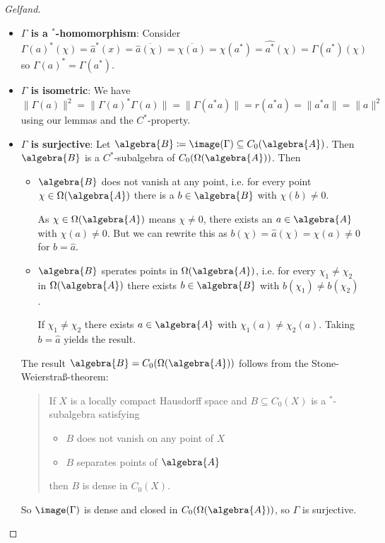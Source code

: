 \documentclass[a4paper]{article}
\begin{document}
\begin{proof}[Gelfand]~
	\begin{itemize}
		\item \textbf{$\Gamma$ is a $^*$-homomorphism}:
		Consider 
		\begin{equation*}
			\Gamma(a)^*(\chi) = \hat{a}^*(x) = \overline{\hat{a}(\chi)} = \overline{\chi(a)} = \chi(a^*) = \hat{a^*}(\chi) =  \Gamma(a^*)(\chi)
		\end{equation*}
		so $\Gamma(a)^* = \Gamma(a^*)$.
		\item \textbf{$\Gamma$ is isometric}:
		We have
		\begin{equation*}
			\|\Gamma(a)\|^2 = \|\Gamma(a)^* \Gamma(a)\| = \|\Gamma(a^* a)\| = r(a^* a) = \|a^* a\| = \|a\|^2
		\end{equation*}
		using our lemmas and the $C^*$-property.
		\item \textbf{$\Gamma$ is surjective}:
		Let $\algebra{B} \coloneq \image(\Gamma) \subseteq C_0(\algebra{A})$.
		Then $\algebra{B}$ is a $C^*$-subalgebra of $C_0(\Omega(\algebra{A}))$.
		Then
		\begin{itemize}
			\item $\algebra{B}$ does not vanish at any point, i.e. for every point $\chi \in \Omega(\algebra{A})$ there is a $b \in \algebra{B}$ with $\chi(b) \neq 0$. 
			
			As $\chi \in \Omega(\algebra{A})$ means $\chi \neq 0$, there exists an $a \in \algebra{A}$ with $\chi(a) \neq 0$.
			But we can rewrite this as $b(\chi) = \hat{a}(\chi) = \chi(a) \neq 0$ for $b = \hat{a}$.
			\item $\algebra{B}$ sperates points in $\Omega(\algebra{A})$, i.e. for every $\chi_1 \neq \chi_2$ in $\Omega(\algebra{A})$ there exists $b \in \algebra{B}$ with $b(\chi_1) \neq b(\chi_2)$.
			
			If $\chi_1 \neq \chi_2$ there exists $a \in \algebra{A}$ with $\chi_1(a) \neq \chi_2(a)$.
			Taking $b = \hat{a}$ yields the result.
		\end{itemize}
		The result $\algebra{B} = C_0(\Omega(\algebra{A}))$ follows from the Stone-Weierstraß-theorem:
		\begin{quote}
			If $X$ is a locally compact Hausdorff space and $B \subseteq C_0(X)$ is a $^*$-subalgebra satisfying
			\begin{itemize}
				\item $B$ does not vanish on any point of $X$
				\item $B$ separates points of $\algebra{A}$
			\end{itemize}
			then $B$ is dense in $C_0(X)$.
		\end{quote}
		So $\image(\Gamma)$ is dense and closed in $C_0(\Omega(\algebra{A}))$, so $\Gamma$ is surjective.
	\end{itemize}
\end{proof}
\end{document}
